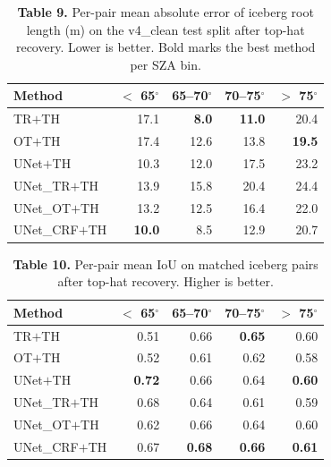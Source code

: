 \documentclass[review,jog]{igs}
\begin{document}
\begin{table}[h]
\caption{\textbf{Table 9.} Per-pair mean absolute error of iceberg root length (m) on the v4\_clean test split after top-hat recovery. Lower is better. Bold marks the best method per SZA bin.}
\centering
\begin{tabular}{lrrrr}
\toprule
Method & $<$ 65$^\circ$ & 65--70$^\circ$ & 70--75$^\circ$ & $>$ 75$^\circ$ \\
\midrule
TR$+$TH        & 17.1           & \textbf{8.0}   & \textbf{11.0}  & 20.4 \\
OT$+$TH        & 17.4           & 12.6           & 13.8           & \textbf{19.5} \\
UNet$+$TH      & 10.3           & 12.0           & 17.5           & 23.2 \\
UNet\_TR$+$TH  & 13.9           & 15.8           & 20.4           & 24.4 \\
UNet\_OT$+$TH  & 13.2           & 12.5           & 16.4           & 22.0 \\
UNet\_CRF$+$TH & \textbf{10.0}  & 8.5            & 12.9           & 20.7 \\
\bottomrule
\end{tabular}
\end{table}

\begin{table}[h]
\caption{\textbf{Table 10.} Per-pair mean IoU on matched iceberg pairs after top-hat recovery. Higher is better.}
\centering
\begin{tabular}{lrrrr}
\toprule
Method & $<$ 65$^\circ$ & 65--70$^\circ$ & 70--75$^\circ$ & $>$ 75$^\circ$ \\
\midrule
TR$+$TH        & 0.51           & 0.66           & \textbf{0.65}  & 0.60 \\
OT$+$TH        & 0.52           & 0.61           & 0.62           & 0.58 \\
UNet$+$TH      & \textbf{0.72}  & 0.66           & 0.64           & \textbf{0.60} \\
UNet\_TR$+$TH  & 0.68           & 0.64           & 0.61           & 0.59 \\
UNet\_OT$+$TH  & 0.62           & 0.66           & 0.64           & 0.60 \\
UNet\_CRF$+$TH & 0.67           & \textbf{0.68}  & \textbf{0.66}  & \textbf{0.61} \\
\bottomrule
\end{tabular}
\end{table}
\end{document}
